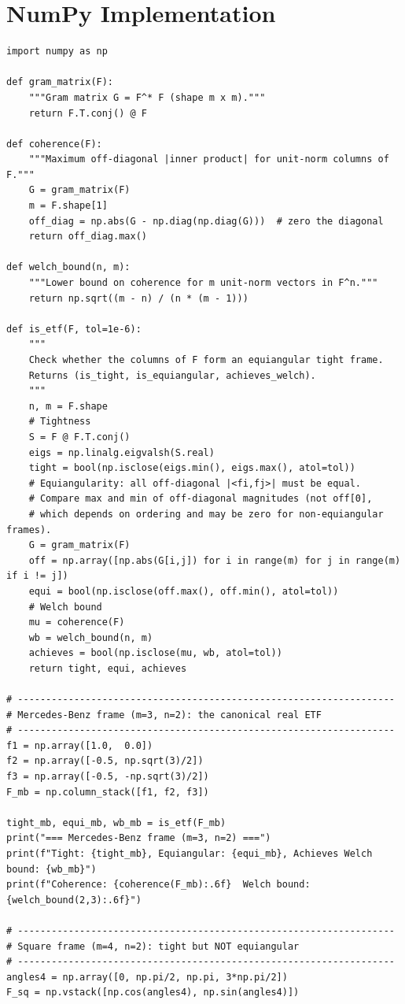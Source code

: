 \section{NumPy Implementation}
\label{sec:numpy-etf}

\begin{lstlisting}[caption={Coherence, Welch bound, and ETF verification in NumPy}]
import numpy as np

def gram_matrix(F):
    """Gram matrix G = F^* F (shape m x m)."""
    return F.T.conj() @ F

def coherence(F):
    """Maximum off-diagonal |inner product| for unit-norm columns of F."""
    G = gram_matrix(F)
    m = F.shape[1]
    off_diag = np.abs(G - np.diag(np.diag(G)))  # zero the diagonal
    return off_diag.max()

def welch_bound(n, m):
    """Lower bound on coherence for m unit-norm vectors in F^n."""
    return np.sqrt((m - n) / (n * (m - 1)))

def is_etf(F, tol=1e-6):
    """
    Check whether the columns of F form an equiangular tight frame.
    Returns (is_tight, is_equiangular, achieves_welch).
    """
    n, m = F.shape
    # Tightness
    S = F @ F.T.conj()
    eigs = np.linalg.eigvalsh(S.real)
    tight = bool(np.isclose(eigs.min(), eigs.max(), atol=tol))
    # Equiangularity: all off-diagonal |<fi,fj>| must be equal.
    # Compare max and min of off-diagonal magnitudes (not off[0],
    # which depends on ordering and may be zero for non-equiangular frames).
    G = gram_matrix(F)
    off = np.array([np.abs(G[i,j]) for i in range(m) for j in range(m) if i != j])
    equi = bool(np.isclose(off.max(), off.min(), atol=tol))
    # Welch bound
    mu = coherence(F)
    wb = welch_bound(n, m)
    achieves = bool(np.isclose(mu, wb, atol=tol))
    return tight, equi, achieves

# -------------------------------------------------------------------
# Mercedes-Benz frame (m=3, n=2): the canonical real ETF
# -------------------------------------------------------------------
f1 = np.array([1.0,  0.0])
f2 = np.array([-0.5, np.sqrt(3)/2])
f3 = np.array([-0.5, -np.sqrt(3)/2])
F_mb = np.column_stack([f1, f2, f3])

tight_mb, equi_mb, wb_mb = is_etf(F_mb)
print("=== Mercedes-Benz frame (m=3, n=2) ===")
print(f"Tight: {tight_mb}, Equiangular: {equi_mb}, Achieves Welch bound: {wb_mb}")
print(f"Coherence: {coherence(F_mb):.6f}  Welch bound: {welch_bound(2,3):.6f}")

# -------------------------------------------------------------------
# Square frame (m=4, n=2): tight but NOT equiangular
# -------------------------------------------------------------------
angles4 = np.array([0, np.pi/2, np.pi, 3*np.pi/2])
F_sq = np.vstack([np.cos(angles4), np.sin(angles4)])


\end{lstlisting}
